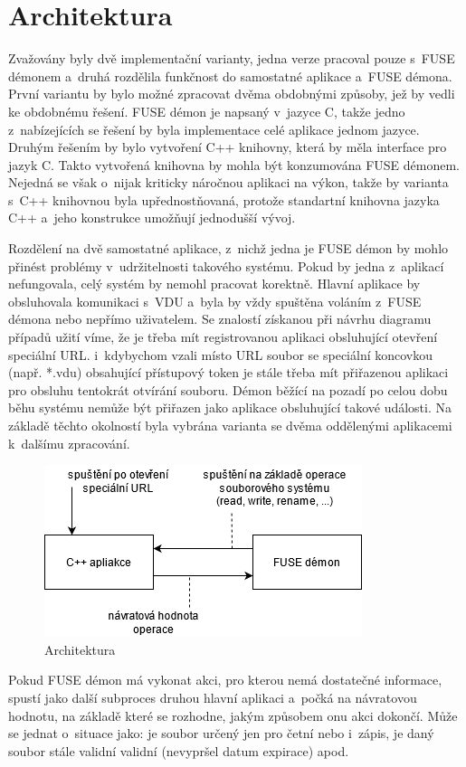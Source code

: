 \section{Architektura}

Zvažovány byly dvě implementační varianty, jedna verze pracoval pouze s FUSE démonem a druhá rozdělila funkčnost do samostatné aplikace a FUSE démona. První variantu by
bylo možné zpracovat dvěma obdobnými způsoby, jež by vedli ke obdobnému řešení. FUSE démon je napsaný v jazyce C, takže jedno z nabízejících se řešení by byla implementace
celé aplikace jednom jazyce. Druhým řešením by bylo vytvoření C++ knihovny, která by měla interface pro jazyk C. Takto vytvořená knihovna by mohla být konzumována FUSE démonem.
Nejedná se však o nijak kriticky náročnou aplikaci na výkon, takže by varianta s C++ knihovnou byla upřednostňovaná, protože standartní knihovna jazyka C++ a jeho konstrukce 
umožňují jednodušší vývoj.

Rozdělení na dvě samostatné aplikace, z nichž jedna je FUSE démon by mohlo přinést problémy v udržitelnosti takového systému. Pokud by jedna z aplikací nefungovala, celý systém
by nemohl pracovat korektně. Hlavní aplikace by obsluhovala komunikaci s VDU a byla by vždy spuštěna voláním z FUSE démona nebo nepřímo uživatelem. Se znalostí 
získanou při návrhu diagramu případů užití víme, že je třeba mít registrovanou aplikaci obsluhující otevření speciální URL. i kdybychom vzali místo URL soubor se speciální
koncovkou (např. *.vdu) obsahující přístupový token je stále třeba mít přiřazenou aplikaci pro obsluhu tentokrát otvírání souboru. Démon běžící na pozadí po celou dobu běhu
systému nemůže být přiřazen jako aplikace obsluhující takové události. Na základě těchto okolností byla vybrána varianta se dvěma oddělenými aplikacemi k dalšímu zpracování.

\begin{figure}[h]
    \centering
    \includegraphics[width=0.47\linewidth]{other-fig/architecture.png}
    \caption{Architektura}
\end{figure}

Pokud FUSE démon má vykonat akci, pro kterou nemá dostatečné informace, spustí jako další subproces druhou hlavní aplikaci a počká na návratovou hodnotu, na základě
které se rozhodne, jakým způsobem onu akci dokončí. Může se jednat o situace jako: je soubor určený jen pro četní nebo i zápis, je daný soubor stále validní
validní (nevypršel datum expirace) apod.

